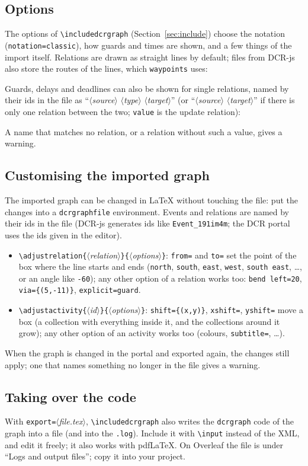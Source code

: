 \documentclass[a4paper,11pt]{article}
\newcommand\example[1]{%
  \begin{tcolorbox}[colback=white, colframe=black!25, boxrule=0.4pt,
      arc=1mm, left=2mm, right=2mm, halign lower=flush center]
    
    \tcblower
    
  \end{tcolorbox}}
\newcommand\cs[1]{\texttt{\textbackslash#1}}
\newcommand\key[1]{\texttt{#1}}
\newcommand\meta[1]{\ensuremath{\langle}\textit{#1}\ensuremath{\rangle}}
\newcommand\marg[1]{\texttt{\{}\meta{#1}\texttt{\}}}
\begin{document}
\subsection{Options}
The options of \cs{includedcrgraph} (Section~\ref{sec:include}) choose the
notation (\key{notation=classic}), how guards and times are shown, and a
few things of the import itself. Relations are drawn as straight lines by
default; files from DCR-js also store the routes of the lines, which
\key{waypoints} uses:
\example{import-waypoints}
Guards, delays and deadlines can also be
shown for single relations, named by their ids in the file as
``\meta{source} \meta{type} \meta{target}'' (or ``\meta{source}
\meta{target}'' if there is only one relation between the two; \key{value}
is the update relation):
\example{import-options}
A name that matches no relation, or a relation without such a value, gives a
warning.

\subsection{Customising the imported graph}\label{sec:adjust}
The imported graph can be changed in \LaTeX{} without touching the file:
put the changes into a \texttt{dcrgraphfile} environment. Events and
relations are named by their ids in the file (DCR-js generates ids like
\texttt{Event\_191im4m}; the DCR portal uses the ids given in the editor).
\example{adjust}
\begin{itemize}
  \item \cs{adjustrelation}\marg{relation}\marg{options}: \key{from=} and
    \key{to=} set the point of the box where the line starts and ends
    (\key{north}, \key{south}, \key{east}, \key{west}, \key{south east},
    \dots, or an angle like \key{-60}); any other option of a relation
    works too: \key{bend left=20}, \key{via=\{(5,-11)\}}, \key{explicit=guard}.
  \item \cs{adjustactivity}\marg{id}\marg{options}: \key{shift=\{(x,y)\}},
    \key{xshift=}, \key{yshift=} move a box (a collection with everything
    inside it, and the collections around it grow); any other option of an
    activity works too (colours, \key{subtitle=}, \dots).
\end{itemize}
When the graph is changed in the portal and exported again, the changes
still apply; one that names something no longer in the file gives a warning.

\subsection{Taking over the code}
With \key{export=}\meta{file.tex}, \cs{includedcrgraph} also writes the
\texttt{dcrgraph} code of the graph into a file (and into the \texttt{.log}).
Include it with \cs{input} instead of the XML, and edit it freely; it
also works with pdf\LaTeX. On Overleaf the file is under ``Logs and output
files''; copy it into your project.
\end{document}
